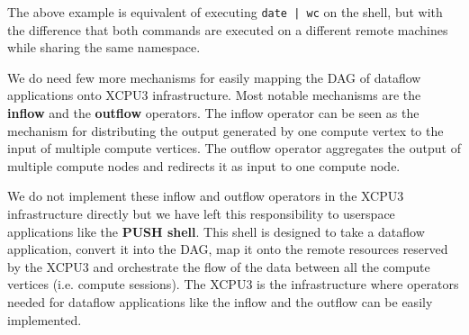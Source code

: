 The above example is equivalent of executing \texttt{date | wc} on the shell,
but with the difference that both commands are executed on a different remote
machines while sharing the same namespace.

We do need few more mechanisms for easily mapping the DAG of dataflow
applications onto XCPU3 infrastructure.  Most notable mechanisms are the
\textbf{inflow} and the \textbf{outflow} operators.  The inflow operator can be
seen as the mechanism for distributing the output generated by one compute
vertex to the input of multiple compute vertices.  The outflow operator
aggregates the output of multiple compute nodes and redirects it as input to one
compute node.

We do not implement these inflow and outflow operators in the XCPU3
infrastructure directly but we have left this responsibility to userspace
applications like the \textbf{PUSH shell}\cite{PODC:Push}. This shell is
designed to take a dataflow application, convert it into the DAG, map it
onto the remote resources reserved by the XCPU3 and orchestrate the flow of the
data between all the compute vertices (i.e. compute sessions). The XCPU3 is the
infrastructure where operators needed for dataflow applications like the inflow
and the outflow can be easily implemented.



